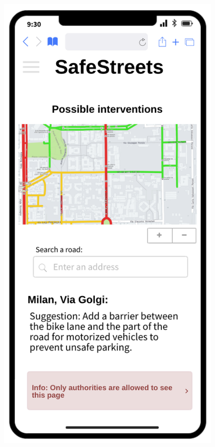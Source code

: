 	\begin{figure}[H]
	\centering
	\begin{minipage}[b]{0.40\textwidth}
		\includegraphics[width=\textwidth]{Images/interventions.png}

\end{minipage}
\end{figure}
